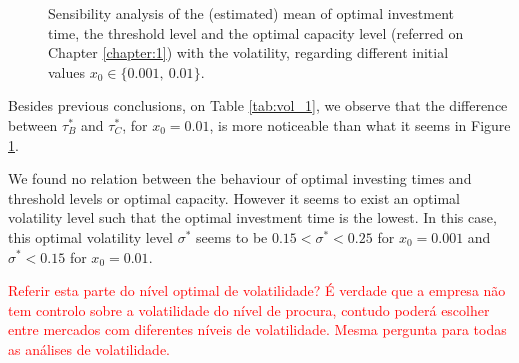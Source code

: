 \begin{figure}[!ht]
	\begin{subfigmatrix}{3}
	\end{subfigmatrix}
	\caption{Sensibility analysis of the (estimated) mean of optimal investment time, the threshold level and the optimal capacity level (referred on Chapter \ref{chapter:1}) with the volatility, regarding different initial values $x_0 \in \{0.001, \ 0.01\}$.}
	\label{fig:vol_1}
\end{figure}

Besides previous conclusions, on Table \ref{tab:vol_1}, we observe that the difference between $\tau_B^*$ and $\tau_C^*$, for $x_0=0.01$, is more noticeable than what it seems in Figure \ref{fig:vol_1}.

We found no relation between the behaviour of optimal investing times and threshold levels or optimal capacity. However it seems to exist an optimal volatility level such that the optimal investment time is the lowest. In this case, this optimal volatility level $\sigma^*$ seems to be $0.15 < \sigma^* < 0.25$ for $x_0=0.001$ and $\sigma^*<0.15$ for $x_0=0.01$.

\textcolor{red}{Referir esta parte do nível optimal de volatilidade? É verdade que a empresa não tem controlo sobre a volatilidade do nível de procura, contudo poderá escolher entre mercados com diferentes níveis de volatilidade. Mesma pergunta para todas as análises de volatilidade.}

